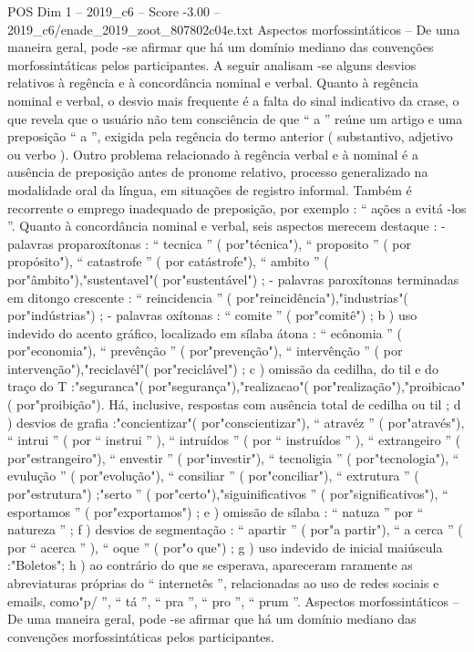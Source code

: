 \begin{textsample}{POS Dim 1 – 2019\_c6 – Score -3.00 – 2019\_c6/enade\_2019\_zoot\_807802c04e.txt}
Aspectos morfossintáticos – De uma maneira geral, pode -se afirmar que há um domínio mediano das convenções morfossintáticas pelos participantes.
A seguir analisam -se alguns desvios relativos à regência e à concordância nominal e verbal.
Quanto à regência nominal e verbal, o desvio mais frequente é a falta do sinal indicativo da crase, o que revela que o usuário não tem consciência de que “ a ” reúne um artigo e uma preposição “ a ”, exigida pela regência do termo anterior ( substantivo, adjetivo ou verbo ).
Outro problema relacionado à regência verbal e à nominal é a ausência de preposição antes de pronome relativo, processo generalizado na modalidade oral da língua, em situações de registro informal.
Também é recorrente o emprego inadequado de preposição, por exemplo : “ ações a evitá -los ”.
Quanto à concordância nominal e verbal, seis aspectos merecem destaque : - palavras proparoxítonas : “ tecnica ” ( por"técnica"), “ proposito ” ( por propósito"), “ catastrofe ” ( por catástrofe"), “ ambito ” ( por"âmbito"),"sustentavel"( por"sustentável") ; - palavras paroxítonas terminadas em ditongo crescente : “ reincidencia ” ( por"reincidência"),"industrias"( por"indústrias") ; - palavras oxítonas : “ comite ” ( por"comitê") ; b ) uso indevido do acento gráfico, localizado em sílaba átona : “ ecônomia ” ( por"economia"), “ prevênção ” ( por"prevenção"), “ intervênção ” ( por intervenção"),"reciclavél"( por"reciclável") ; c ) omissão da cedilha, do til e do traço do T :"seguranca"( por"segurança"),"realizacao"( por"realização"),"proibicao"( por"proibição").
Há, inclusive, respostas com ausência total de cedilha ou til ; d ) desvios de grafia :"concientizar"( por"conscientizar"), “ atravéz ” ( por"através"), “ intrui ” ( por “ instrui ” ), “ intruídos ” ( por “ instruídos ” ), “ extrangeiro ” ( por"estrangeiro"), “ envestir ” ( por"investir"), “ tecnoligia ” ( por"tecnologia"), “ evulução ” ( por"evolução"), “ consiliar ” ( por"conciliar"), “ extrutura ” ( por"estrutura") ;"serto ” ( por"certo"),"siguinificativos ” ( por"significativos"), “ esportamos ” ( por"exportamos") ; e ) omissão de sílaba : “ natuza ” por “ natureza ” ; f ) desvios de segmentação : “ apartir ” ( por"a partir"), “ a cerca ” ( por “ acerca ” ), “ oque ” ( por"o que") ; g ) uso indevido de inicial maiúscula :"Boletos"; h ) ao contrário do que se esperava, apareceram raramente as abreviaturas próprias do “ internetês ”, relacionadas ao uso de redes sociais e emails, como"p/ ”, “ tá ”, “ pra ”, “ pro ”, “ prum ”.
Aspectos morfossintáticos – De uma maneira geral, pode -se afirmar que há um domínio mediano das convenções morfossintáticas pelos participantes.

\end{textsample}
